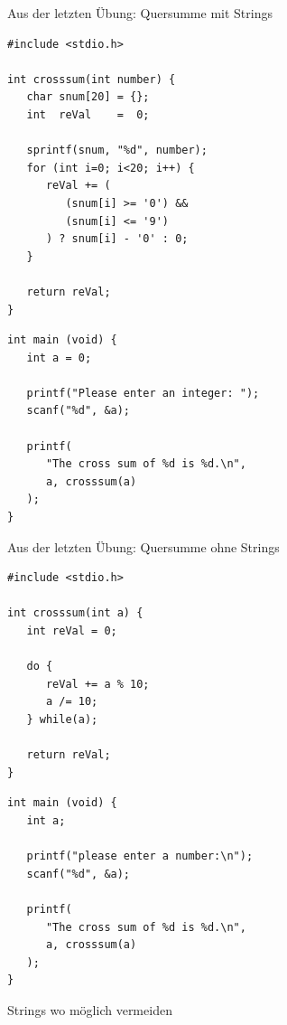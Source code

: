 \begin{frame}[fragile]{Aus der letzten Übung: Quersumme mit Strings}
%
\begin{codebox}
\begin{verbatim}
#include <stdio.h>

int crosssum(int number) {
   char snum[20] = {};
   int  reVal    =  0;

   sprintf(snum, "%d", number);
   for (int i=0; i<20; i++) {
      reVal += (
         (snum[i] >= '0') && 
         (snum[i] <= '9')
      ) ? snum[i] - '0' : 0;
   }

   return reVal;
}
\end{verbatim}
\end{codebox}
%
\begin{codebox}[...Fortsetzung]
\begin{verbatim}
int main (void) {
   int a = 0;

   printf("Please enter an integer: ");
   scanf("%d", &a);

   printf(
      "The cross sum of %d is %d.\n",
      a, crosssum(a)
   );
}
\end{verbatim}
\end{codebox}
%
\end{frame}


\begin{frame}[fragile]{Aus der letzten Übung: Quersumme ohne Strings}
%
\begin{codebox}
\begin{verbatim}
#include <stdio.h>

int crosssum(int a) {
   int reVal = 0;

   do {
      reVal += a % 10;
      a /= 10;
   } while(a);

   return reVal;
}
\end{verbatim}
\end{codebox}
%
\begin{codebox}[...Fortsetzung]
\begin{verbatim}
int main (void) {
   int a;

   printf("please enter a number:\n");
   scanf("%d", &a);

   printf(
      "The cross sum of %d is %d.\n",
      a, crosssum(a)
   );
}
\end{verbatim}
\end{codebox}
%
\begin{hintbox}
Strings wo möglich vermeiden
\end{hintbox}
%
\end{frame}

